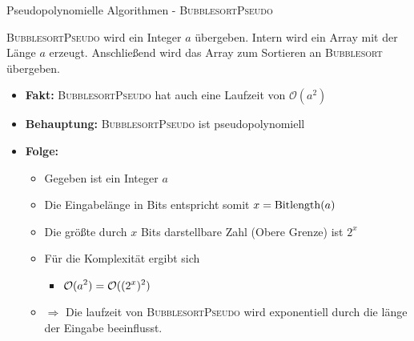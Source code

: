 \begin{frame}{Pseudopolynomielle Algorithmen - \textsc{BubblesortPseudo}}
	
	\textsc{BubblesortPseudo} wird ein Integer $a$ übergeben. Intern wird ein Array mit der Länge $a$ erzeugt. Anschließend wird das Array zum Sortieren an \textsc{Bubblesort} übergeben.
	
	\begin{itemize}
		
		\item \textbf{Fakt:} \textsc{BubblesortPseudo} hat auch eine Laufzeit von $\mathcal{O}(a^2)$
		\item \textbf{Behauptung:} \textsc{BubblesortPseudo} ist pseudopolynomiell
		\pause
		\item \textbf{Folge:} 
		\begin{itemize}
			\item Gegeben ist ein Integer $a$ 
			\item Die Eingabelänge in Bits entspricht somit $x = \operatorname{Bitlength}(a)$
			\item Die größte durch $x$ Bits darstellbare Zahl (Obere Grenze) ist $2^x$
			\item Für die Komplexität ergibt sich
			\begin{itemize}
				\item $\displaystyle \mathcal{O}(a^2) = \mathcal{O}((2^x)^2)$
			\end{itemize}
			\item[] $\Rightarrow$ Die laufzeit von \textsc{BubblesortPseudo} wird exponentiell durch die länge der Eingabe beeinflusst. 
		\end{itemize}
	\end{itemize}
\end{frame}


